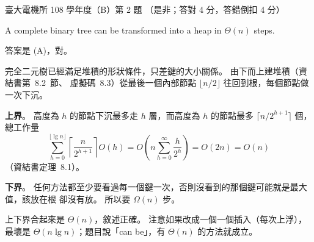 \begin{pastexam}[label={px:ntu-108-ee-dsb-02}]{臺大電機所 108 學年度（B）第 2 題}
（是非；答對 4 分，答錯倒扣 4 分）

A complete binary tree can be transformed into a heap in $\Theta(n)$ steps.
\end{pastexam}

\begin{pastsoln}
答案是 (A)，對。

完全二元樹已經滿足堆積的形狀條件，只差鍵的大小關係。 由下而上建堆積（資結書第~8.2~節、
虛擬碼~8.3）從最後一個內部節點 $\lfloor n/2 \rfloor$ 往回到根，每個節點做一次下沉。

\textbf{上界}。 高度為 $h$ 的節點下沉最多走 $h$ 層，而高度為 $h$ 的節點最多
$\lceil n/2^{h+1} \rceil$ 個，總工作量
\[
\sum_{h=0}^{\lfloor \lg n \rfloor} \left\lceil \frac{n}{2^{h+1}} \right\rceil O(h)
= O\!\left(n \sum_{h=0}^{\infty} \frac{h}{2^{h}}\right) = O(2n) = O(n)
\]
（資結書定理~8.1）。

\textbf{下界}。 任何方法都至少要看過每一個鍵一次，否則沒看到的那個鍵可能就是最大值，該放在根
卻沒有放。 所以要 $\Omega(n)$ 步。

上下界合起來是 $\Theta(n)$，敘述正確。 注意如果改成一個一個插入（每次上浮），最壞是
$\Theta(n \lg n)$；題目說「can be」，有 $\Theta(n)$ 的方法就成立。
\end{pastsoln}
